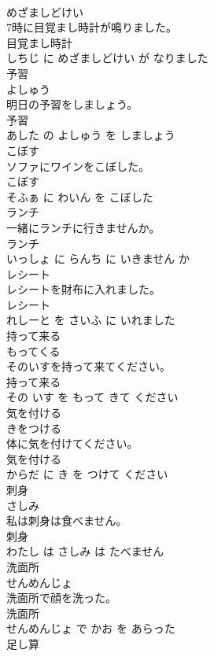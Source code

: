 \documentclass[8pt]{extreport}
\begin{document}
\begin{CJK}{UTF8}{min}
\\	めざましどけい			
\\	7時に目覚まし時計が鳴りました。	
\\	目覚まし時計 
\\	しちじ に めざましどけい が なりました			
\\	予習	
\\	よしゅう			
\\	明日の予習をしましょう。	
\\	予習 
\\	あした の よしゅう を しましょう			
\\	こぼす	
\\	ソファにワインをこぼした。	
\\	こぼす 
\\	そふぁ に わいん を こぼした			
\\	ランチ	
\\	一緒にランチに行きませんか。	
\\	ランチ 
\\	いっしょ に らんち に いきません か			
\\	レシート	
\\	レシートを財布に入れました。	
\\	レシート 
\\	れしーと を さいふ に いれました			
\\	持って来る	
\\	もってくる			
\\	そのいすを持って来てください。	
\\	持って来る 
\\	その いす を もって きて ください			
\\	気を付ける	
\\	きをつける			
\\	体に気を付けてください。	
\\	気を付ける 
\\	からだ に き を つけて ください			
\\	刺身	
\\	さしみ			
\\	私は刺身は食べません。	
\\	刺身 
\\	わたし は さしみ は たべません			
\\	洗面所	
\\	せんめんじょ			
\\	洗面所で顔を洗った。	
\\	洗面所 
\\	せんめんじょ で かお を あらった			
\\	足し算	

\end{CJK}
\end{document}
